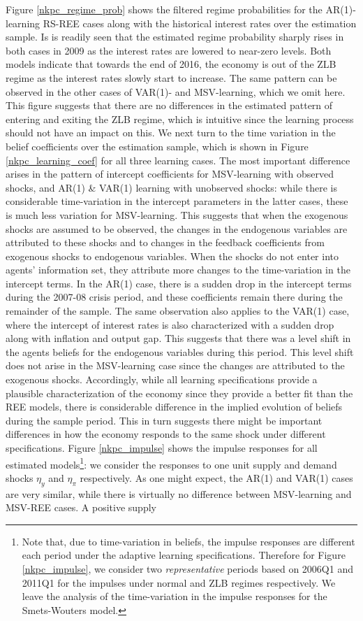 \documentclass[12pt,reqno]{article}
\numberwithin{equation}{section}
\begin{document}
\noindent
Figure \ref{nkpc_regime_prob} shows the filtered regime probabilities for the AR(1)-learning RS-REE cases along with the historical interest rates over the estimation sample. Is is readily seen that the estimated regime probability sharply rises in both cases in 2009 as the interest rates are lowered to near-zero levels. Both models indicate that towards the end of 2016, the economy is out of the ZLB regime as the interest rates slowly start to increase. The same pattern can be observed in the other cases of VAR(1)- and MSV-learning, which we omit here. This figure suggests that there are no differences in the estimated pattern of entering and exiting the ZLB regime, which is intuitive since the learning process should not have an impact on this. We next turn to the time variation in the belief coefficients over the estimation sample, which is shown in Figure \ref{nkpc_learning_coef} for all three learning cases. The most important difference arises in the pattern of intercept coefficients for MSV-learning with observed shocks, and AR(1) \& VAR(1) learning with unobserved shocks: while there is considerable time-variation in the intercept parameters in the latter cases, these is much less variation for MSV-learning. This suggests that when the exogenous shocks are assumed to be observed, the changes in the endogenous variables are attributed to these shocks and to changes in the feedback coefficients from exogenous shocks to endogenous variables. When the shocks do not enter into agents' information set, they attribute more changes to the time-variation in the intercept terms. In the AR(1) case, there is a sudden drop in the intercept terms during the 2007-08 crisis period, and these coefficients remain there during the remainder of the sample. The same observation also applies to the VAR(1) case, where the intercept of interest rates is also characterized with a sudden drop along with inflation and output gap. This suggests that there was a level shift in the agents beliefs for the endogenous variables during this period. This level shift does not arise in the MSV-learning case since the changes are attributed to the exogenous shocks. Accordingly, while all learning specifications provide a plausible characterization of the economy since they provide a better fit than the REE models, there is considerable difference in the implied evolution of beliefs during the sample period. This in turn suggests there might be important differences in how the economy responds to the same shock under different specifications.  Figure \ref{nkpc_impulse} shows the impulse responses for all estimated models\footnote{Note that, due to time-variation in beliefs, the impulse responses are different each period under the adaptive learning specifications. Therefore for Figure \ref{nkpc_impulse}, we consider two \textit{representative} periods based on 2006Q1 and 2011Q1 for the impulses under normal and ZLB regimes respectively. We leave the analysis of the time-variation in the impulse responses for the Smets-Wouters model.}: we consider the responses to one unit supply and demand shocks $\eta_y$ and $\eta_{\pi}$ respectively. As one might expect, the AR(1) and VAR(1) cases are very similar, while there is virtually no difference between MSV-learning and MSV-REE cases. A positive supply 
\end{document}
